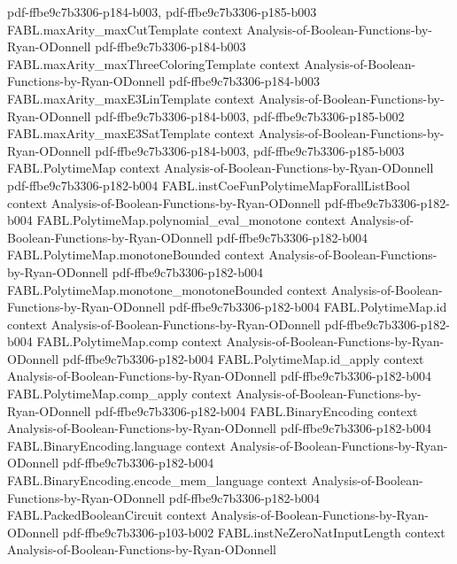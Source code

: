 \begin{theorem}
  {pdf-ffbe9c7b3306-p184-b003,
    pdf-ffbe9c7b3306-p185-b003}
\proofstep
  {FABL.maxArity_maxCutTemplate}
  {context}
  {Analysis-of-Boolean-Functions-by-Ryan-ODonnell}
  {pdf-ffbe9c7b3306-p184-b003}
\proofstep
  {FABL.maxArity_maxThreeColoringTemplate}
  {context}
  {Analysis-of-Boolean-Functions-by-Ryan-ODonnell}
  {pdf-ffbe9c7b3306-p184-b003}
\proofstep
  {FABL.maxArity_maxE3LinTemplate}
  {context}
  {Analysis-of-Boolean-Functions-by-Ryan-ODonnell}
  {pdf-ffbe9c7b3306-p184-b003,
    pdf-ffbe9c7b3306-p185-b002}
\proofstep
  {FABL.maxArity_maxE3SatTemplate}
  {context}
  {Analysis-of-Boolean-Functions-by-Ryan-ODonnell}
  {pdf-ffbe9c7b3306-p184-b003,
    pdf-ffbe9c7b3306-p185-b003}
\proofstep
  {FABL.PolytimeMap}
  {context}
  {Analysis-of-Boolean-Functions-by-Ryan-ODonnell}
  {pdf-ffbe9c7b3306-p182-b004}
\proofstep
  {FABL.instCoeFunPolytimeMapForallListBool}
  {context}
  {Analysis-of-Boolean-Functions-by-Ryan-ODonnell}
  {pdf-ffbe9c7b3306-p182-b004}
\proofstep
  {FABL.PolytimeMap.polynomial_eval_monotone}
  {context}
  {Analysis-of-Boolean-Functions-by-Ryan-ODonnell}
  {pdf-ffbe9c7b3306-p182-b004}
\proofstep
  {FABL.PolytimeMap.monotoneBounded}
  {context}
  {Analysis-of-Boolean-Functions-by-Ryan-ODonnell}
  {pdf-ffbe9c7b3306-p182-b004}
\proofstep
  {FABL.PolytimeMap.monotone_monotoneBounded}
  {context}
  {Analysis-of-Boolean-Functions-by-Ryan-ODonnell}
  {pdf-ffbe9c7b3306-p182-b004}
\proofstep
  {FABL.PolytimeMap.id}
  {context}
  {Analysis-of-Boolean-Functions-by-Ryan-ODonnell}
  {pdf-ffbe9c7b3306-p182-b004}
\proofstep
  {FABL.PolytimeMap.comp}
  {context}
  {Analysis-of-Boolean-Functions-by-Ryan-ODonnell}
  {pdf-ffbe9c7b3306-p182-b004}
\proofstep
  {FABL.PolytimeMap.id_apply}
  {context}
  {Analysis-of-Boolean-Functions-by-Ryan-ODonnell}
  {pdf-ffbe9c7b3306-p182-b004}
\proofstep
  {FABL.PolytimeMap.comp_apply}
  {context}
  {Analysis-of-Boolean-Functions-by-Ryan-ODonnell}
  {pdf-ffbe9c7b3306-p182-b004}
\proofstep
  {FABL.BinaryEncoding}
  {context}
  {Analysis-of-Boolean-Functions-by-Ryan-ODonnell}
  {pdf-ffbe9c7b3306-p182-b004}
\proofstep
  {FABL.BinaryEncoding.language}
  {context}
  {Analysis-of-Boolean-Functions-by-Ryan-ODonnell}
  {pdf-ffbe9c7b3306-p182-b004}
\proofstep
  {FABL.BinaryEncoding.encode_mem_language}
  {context}
  {Analysis-of-Boolean-Functions-by-Ryan-ODonnell}
  {pdf-ffbe9c7b3306-p182-b004}
\proofstep
  {FABL.PackedBooleanCircuit}
  {context}
  {Analysis-of-Boolean-Functions-by-Ryan-ODonnell}
  {pdf-ffbe9c7b3306-p103-b002}
\proofstep
  {FABL.instNeZeroNatInputLength}
  {context}
  {Analysis-of-Boolean-Functions-by-Ryan-ODonnell}

\end{theorem}
